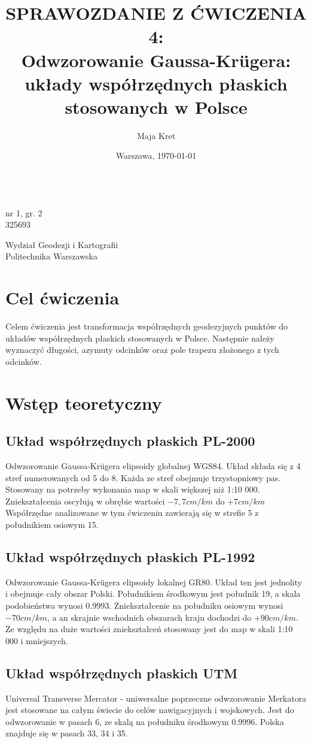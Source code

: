 \documentclass[fleqn,10pt,a4paper]{article}
\title{\textbf{SPRAWOZDANIE Z ĆWICZENIA 4:}\\ Odwzorowanie Gaussa-Krügera: układy współrzędnych
    płaskich stosowanych w Polsce}
\author{Maja Kret}
\date{Warszawa, \today}
\makeatletter
\renewcommand{\maketitle}{%
  \begin{titlepage}
    \begin{center}
      \vspace*{2cm}
      {\huge \@title \par}
      \vspace{1.5cm}
      {\large \@author \\ nr 1, gr. 2 \\ 325693 \par}
      \vspace{1.5cm}
      {\large Wydział Geodezji i Kartografii\\ Politechnika Warszawska \par}
      \vspace{11cm}
      {\large \@date \par}
      \vspace{1.5cm}
    \end{center}
  \end{titlepage}
}
\makeatother
\begin{document}
\pagestyle{fancy}
\fancyhf{}
\rfoot{\thepage}
\renewcommand{\headrulewidth}{0pt}
\maketitle
\rhead{~}

\tableofcontents
\newpage

\section{Cel ćwiczenia}
Celem ćwiczenia jest transformacja współrzędnych geodezyjnych punktów do
układów współrzędnych płaskich stosowanych w Polsce.
Następnie należy wyznaczyć długości, azymuty odcinków oraz pole trapezu
złożonego z tych odcinków.

\section{Wstęp teoretyczny}

\subsection{Układ współrzędnych płaskich PL-2000}
Odwzorowanie Gaussa-Krügera elipsoidy globalnej WGS84. Układ składa się z 4 stref numerowanych od 5 do 8.
Każda ze stref obejmuje trzystopniowy pas. 
Stosowany na potrzeby wykonania map w skali większej niż 1:10 000. Zniekształcenia oscylują w obrębie wartości 
$-7,7 cm/km$ do $+7 cm/km$
Współrzędne analizowane w tym ćwiczeniu zawierają się w strefie 5 z południkiem osiowym 15\degree.

\subsection{Układ współrzędnych płaskich PL-1992}
Odwzorowanie Gaussa-Krügera elipsoidy lokalnej GR80. Układ ten jest jednolity i obejmuje cały obszar Polski.
Południkiem środkowym jest południk 19\degree, a skala podobieństwa wynosi 0.9993. Zniekształcenie na 
południku osiowym wynosi $-70 cm/km$, a an skrajnie wschodnich obszarach kraju dochodzi do $+90 cm/km$.
Ze względu na duże wartości zniekształceń
stosowany jest do map w skali 1:10 000 i mniejszych.

\subsection{Układ współrzędnych płaskich UTM}
Universal Transverse Mercator - uniwersalne poprzeczne odwzorowanie Merkatora jest stosowane na całym świecie
do celów nawigacyjnych i wojskowych. Jest do odwzorowanie w pasach 6\degree, ze skalą na południku środkowym 0.9996.
Polska znajduje się w pasach 33, 34 i 35. 
\end{document}
